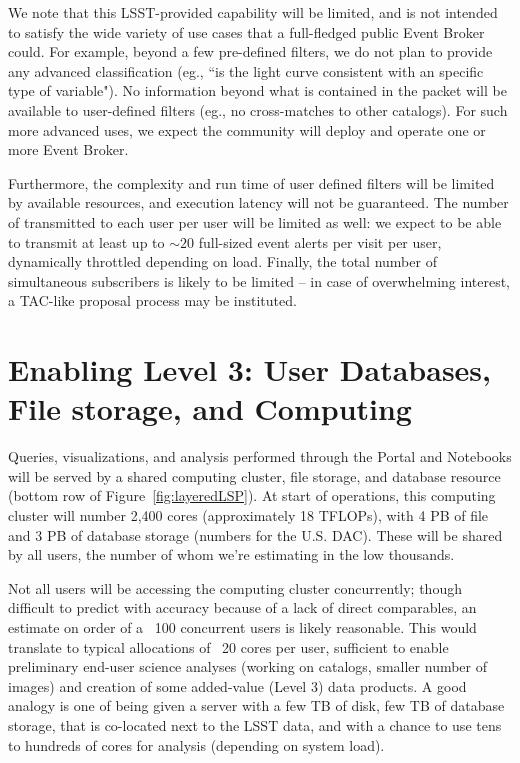 \documentclass[DM,lsstdraft,toc]{lsstdoc}
\begin{document}
We note that this LSST-provided capability will be limited, and is not intended to satisfy the wide variety of use cases that a full-fledged public Event Broker could. For example, beyond a few pre-defined filters, we do not plan to provide any advanced classification (eg., ``is the light curve consistent with an specific type of variable"). No information beyond what is contained in the \VOEvent packet will be available to user-defined filters (eg., no cross-matches to other catalogs). For such more advanced uses, we expect the community will deploy and operate one or more Event Broker.

Furthermore, the complexity and run time of user defined filters will be limited by available resources, and execution latency will not be guaranteed. The number of \VOEvents transmitted to each user per user will be limited as well: we expect to be able to transmit at least up to $\sim 20$ full-sized event alerts per visit per user, dynamically throttled depending on load. Finally, the total number of simultaneous subscribers is likely to be limited -- in case of overwhelming interest, a TAC-like proposal process may be instituted.

\section{Enabling Level 3: User Databases, File storage, and Computing}

Queries, visualizations, and analysis performed through the Portal and
Notebooks will be served by a shared computing cluster, file storage, and
database resource (bottom row of Figure~\ref{fig:layeredLSP}).  At start of operations,
this computing cluster will number 2,400 cores (approximately 18 TFLOPs),
with 4 PB of file and 3 PB of database storage (numbers for the U.S.  DAC). 
These will be shared by all users, the number of whom we’re estimating in
the low thousands.

Not all users will be accessing the computing cluster concurrently; though
difficult to predict with accuracy because of a lack of direct comparables,
an estimate on order of a ~100 concurrent users is likely reasonable.  This
would translate to typical allocations of ~20 cores per user, sufficient to
enable preliminary end-user science analyses (working on catalogs, smaller
number of images) and creation of some added-value (Level 3) data products. 
A good analogy is one of being given a server with a few TB of disk, few TB
of database storage, that is co-located next to the LSST data, and with a
chance to use tens to hundreds of cores for analysis (depending on system
load).
\end{document}
